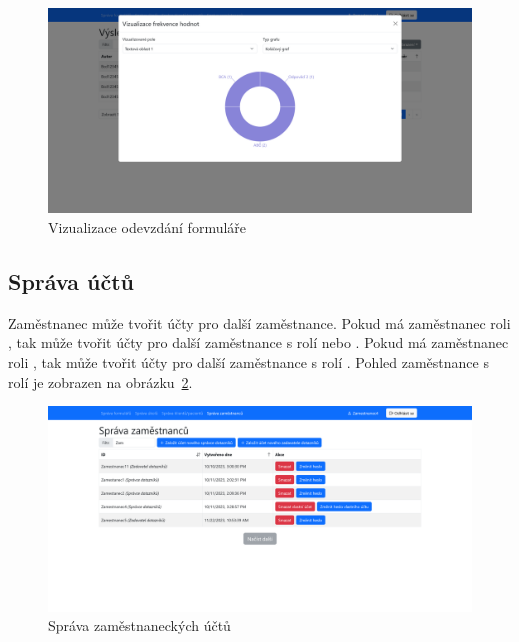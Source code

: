 \begin{figure}[H]
    \includegraphics[width=\textwidth]{../img/screenshots/vysledky-formulare-vizualizace}
    \caption{Vizualizace odevzdání formuláře}\label{fig:nahled-vsechna-odevzdani-vizualizace-zamestnanec-screenshot}
\end{figure}

\subsection{Správa účtů}\label{subsec:sprava-uctu}

Zaměstnanec může tvořit účty pro další zaměstnance.
Pokud má zaměstnanec roli , tak může tvořit účty pro další zaměstnance s rolí  nebo .
Pokud má zaměstnanec roli , tak může tvořit účty pro další zaměstnance s rolí .
Pohled zaměstnance s rolí  je zobrazen na obrázku~\ref{fig:sprava-zamestnancu-screenshot}.

\begin{figure}[H]
    \includegraphics[width=\textwidth]{../img/screenshots/sprava-zamestnancu}
    \caption{Správa zaměstnaneckých účtů}\label{fig:sprava-zamestnancu-screenshot}
\end{figure}

